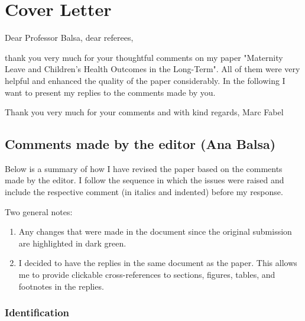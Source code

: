 \thispagestyle{empty}
\chapter*{Cover Letter}



Dear Professor Balsa, dear referees, 

thank you very much for your thoughtful comments on my paper "Maternity Leave and Children's Health Outcomes in the Long-Term". All of them were very helpful and enhanced the quality of the paper considerably. In the following I want to present my replies to the comments made by you. 



Thank you very much for your comments and with kind regards,
Marc Fabel 




\newpage
\singlespacing
\tableofcontents
\onehalfspacing
\clearpage


\newpage
\section{Comments made by the editor (Ana Balsa)}

Below is a summary of how I have revised the paper based on the comments made by the editor. I follow the sequence in which the issues were raised and include the respective comment (in italics and indented) before my response.

Two general notes:
\begin{enumerate}
	\item Any changes that were made in the document since the original submission are highlighted in dark green. 
	\item I decided to have the replies in the same document as the paper. This allows me to provide clickable cross-references to sections, figures, tables, and footnotes in the replies.
\end{enumerate}







\subsection{Identification}

